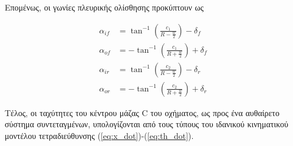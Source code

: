 Επομένως, οι γωνίες πλευρικής ολίσθησης προκύπτουν ως

\begin{align}
	\alpha_{if} &= \tan^{-1}(\frac{c_1}{R-\frac{w}{2}}) - \delta_f
	\label{eq:monst_aif}\\
	\alpha_{of} &= -\tan^{-1}(\frac{c_1}{R+\frac{w}{2}}) + \delta_f
	\label{eq:monst_aof}\\
	\alpha_{ir} &= \tan^{-1}(\frac{c_2}{R-\frac{w}{2}}) - \delta_r
	\label{eq:monst_air}\\
	\alpha_{or} &= -\tan^{-1}(\frac{c_2}{R+\frac{w}{2}}) + \delta_r
	\label{eq:monst_aor}	
\end{align}


Τέλος, οι ταχύτητες του κέντρου μάζας C του οχήματος, ως προς ένα αυθαίρετο σύστημα συντεταγμένων, υπολογίζονται από τους τύπους του ιδανικού κινηματικού μοντέλου τετραδιεύθυνσης (\ref{eq:x_dot})-(\ref{eq:th_dot}).

